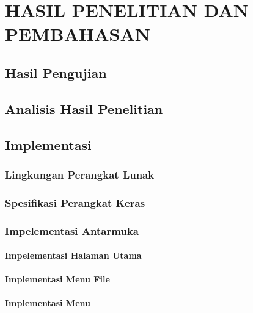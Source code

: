 \chapter{HASIL PENELITIAN DAN PEMBAHASAN}

%
\vspace{4.5pt}
\begin{flushleft}
    \section{Hasil Pengujian}

    \section{Analisis Hasil Penelitian}

\end{flushleft}

\vspace{5cm}
\section{Implementasi}

\subsection{Lingkungan Perangkat Lunak}

\subsection{Spesifikasi Perangkat Keras}

\subsection{Impelementasi Antarmuka}

\subsubsection{Impelementasi Halaman Utama}

\subsubsection{Implementasi Menu File}

\subsubsection{Implementasi Menu}

